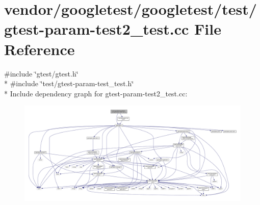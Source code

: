 \hypertarget{gtest-param-test2__test_8cc}{}\section{vendor/googletest/googletest/test/gtest-\/param-\/test2\+\_\+test.cc File Reference}
\label{gtest-param-test2__test_8cc}
{\ttfamily \#include \char`\"{}gtest/gtest.\+h\char`\"{}}\\*
{\ttfamily \#include \char`\"{}test/gtest-\/param-\/test\+\_\+test.\+h\char`\"{}}\\*
Include dependency graph for gtest-\/param-\/test2\+\_\+test.cc\+:
\nopagebreak
\begin{figure}[H]
\begin{center}
\leavevmode
\includegraphics[width=350pt]{gtest-param-test2__test_8cc__incl}
\end{center}
\end{figure}

